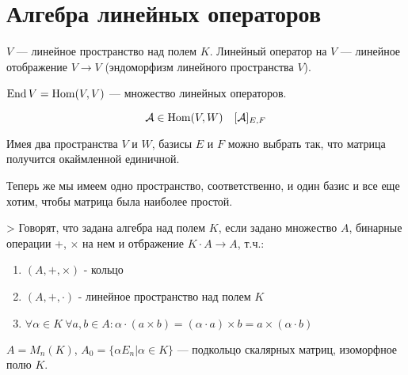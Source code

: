 \documentclass[main]{subfiles}
\begin{document}
\chapter{Алгебра линейных операторов} 
\begin{definition} [Алгебра]
$V$ — линейное пространство над полем $K$. 
Линейный оператор на $V$ — линейное отображение $V \to V$ (эндоморфизм линейного пространства $V$).
\end{definition} 
\begin{definition} 
$\operatorname{End} V = \operatorname{Hom}(V, V)$ —  множество линейных операторов.
\end{definition}

\[\mathcal{A} \in \operatorname{Hom} (V, W) \quad [\mathcal{A}]_{E,F}\]

Имея два пространства $V$ и $W$, базисы $E$ и $F$ можно выбрать так, что матрица получится окаймленной единичной.

Теперь же мы имеем одно пространство, соответственно, и один базис и все еще хотим, чтобы матрица была наиболее простой. 

\begin{definition}>
    Говорят, что задана алгебра над полем $K$, если задано множество $A$, бинарные операции +, $\times$ на нем и отбражение $K \cdot A \to A$, т.ч.:
    \begin{enumerate}
        \item $(A,+, \times)$ - кольцо 
        \item $(A,+, \cdot)$ - линейное пространство над полем $K$
        \item $\forall \alpha \in K \  \forall a, b \in A : \alpha \cdot (a \times b) = (\alpha \cdot a) \times b = a \times (\alpha \cdot b)$
    \end{enumerate}
\end{definition}

\begin{example}
    $A = M_n(K)$, 
    $A_0 = \{ \alpha E_n | \alpha \in K\}$ —  подкольцо скалярных матриц, изоморфное полю $K$.
\end{example}
\end{document}
